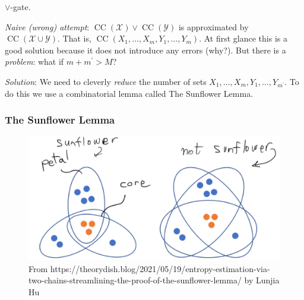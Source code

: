 $\lor$-gate.

\textit{Naive (wrong) attempt}: $\operatorname{CC}(\mathcal X)
\lor \operatorname{CC}(\mathcal Y)$ is approximated by $\operatorname{CC}(\mathcal X \cup \mathcal Y)$. That is, $\operatorname{CC}\left(X_1, \ldots, X_m, Y_1, \ldots, Y_m\right)$. At first glance this is a good solution because it does not introduce any errors (why?). But there is a \textit{problem}: what if $m+m^{\prime}>M$?


\textit{Solution}: We need to cleverly \emph{reduce} the number of sets $X_1, \ldots, X_m, Y_1, \ldots, Y_{m^{\prime}}$. To do this we use a combinatorial lemma called The Sunflower Lemma.

\subsubsection{The Sunflower Lemma}

\begin{figure}
    \centering
        \includegraphics[width=0.75\linewidth]{images/sunflower-lemma.png}
    \caption{From https://theorydish.blog/2021/05/19/entropy-estimation-via-two-chains-streamlining-the-proof-of-the-sunflower-lemma/ by Lunjia Hu}
    \label{fig:enter-label}
\end{figure}




